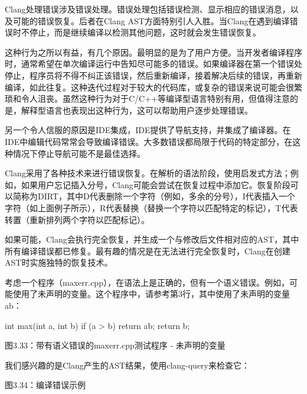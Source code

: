 Clang处理错误涉及错误处理。错误处理包括错误检测、显示相应的错误消息，以及可能的错误恢复。后者在Clang AST方面特别引人入胜。当Clang在遇到编译错误时不停止，而是继续编译以检测其他问题，这时就会发生错误恢复。

这种行为之所以有益，有几个原因。最明显的是为了用户方便。当开发者编译程序时，通常希望在单次编译运行中告知尽可能多的错误。如果编译器在第一个错误处停止，程序员将不得不纠正该错误，然后重新编译，接着解决后续的错误，再重新编译，如此往复。这种迭代过程对于较大的代码库，或复杂的错误来说可能会很繁琐和令人沮丧。虽然这种行为对于C/C++等编译型语言特别有用，但值得注意的是，解释型语言也表现出这种行为，这可以帮助用户逐步处理错误。

另一个令人信服的原因是IDE集成，IDE提供了导航支持，并集成了编译器。在IDE中编辑代码常常会导致编译错误。大多数错误都局限于代码的特定部分，在这种情况下停止导航可能不是最佳选择。

Clang采用了各种技术来进行错误恢复。在解析的语法阶段，使用启发式方法；例如，如果用户忘记插入分号，Clang可能会尝试在恢复过程中添加它。恢复阶段可以简称为DIRT，其中D代表删除一个字符（例如，多余的分号），I代表插入一个字符（如上面例子所示），R代表替换（替换一个字符以匹配特定的标记），T代表转置（重新排列两个字符以匹配标记）。

如果可能，Clang会执行完全恢复，并生成一个与修改后文件相对应的AST，其中所有编译错误都已修复。最有趣的情况是在无法进行完全恢复时，Clang在创建AST时实施独特的恢复技术。

考虑一个程序（maxerr.cpp），在语法上是正确的，但有一个语义错误。例如，可能使用了未声明的变量。这个程序中，请参考第3行，其中使用了未声明的变量ab：

\begin{cpp}
int max(int a, int b) {
  if (a > b) {
    return ab;
  }
  return b;
}
\end{cpp}

\begin{center}
图3.33：带有语义错误的maxerr.cpp测试程序 - 未声明的变量
\end{center}

我们感兴趣的是Clang产生的AST结果，使用clang-query来检查它：


\begin{center}
图3.34：编译错误示例
\end{center}

